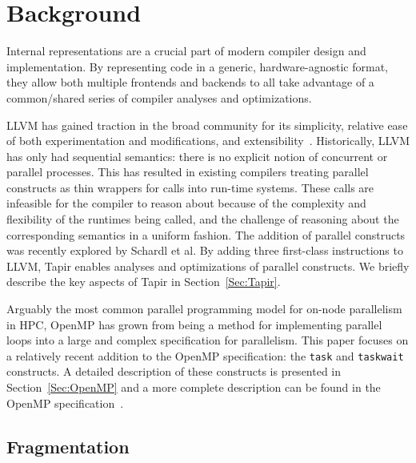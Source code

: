 \documentclass[sigconf]{acmart}
\begin{document}
\section{Background} \label{Sec:Background}

Internal representations are a crucial part of modern compiler design and implementation.  By
representing code in a generic, hardware-agnostic format, they allow both
multiple frontends and backends to all take advantage of a common/shared series of compiler
analyses and optimizations.

LLVM has gained traction in the broad community for its simplicity,
relative ease of both experimentation and modifications, and extensibility~\cite{lattner2004llvm}.
Historically, LLVM has only had sequential semantics: there is no explicit notion
of concurrent or parallel processes. This has resulted in existing compilers
treating parallel constructs as thin wrappers for calls into run-time
systems. These calls are infeasible for the compiler to reason about because of
the complexity and flexibility of the runtimes being called, and the challenge
of reasoning about the corresponding semantics in a uniform fashion. The
addition of parallel constructs was recently explored by Schardl et
al.
By adding three first-class instructions to LLVM, Tapir
enables analyses and optimizations of parallel constructs. We briefly describe
the key aspects of Tapir in Section~\ref{Sec:Tapir}.

Arguably the most common parallel programming model for on-node parallelism
in HPC, OpenMP has grown from being a method for implementing parallel loops into a
large and complex specification for parallelism. This paper focuses on a
relatively recent addition to the OpenMP specification: the \texttt{task}
and \texttt{taskwait} constructs. A detailed description of these constructs
is presented in Section~\ref{Sec:OpenMP} and a more complete description can
be found in the OpenMP specification~\cite{openmp}.

\subsection{Fragmentation}
\end{document}
